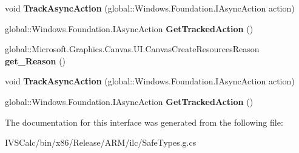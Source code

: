 \begin{DoxyCompactItemize}
\mbox{\label{interface_microsoft_1_1_graphics_1_1_canvas_1_1_u_i_1_1_i_canvas_create_resources_event_args_ae461ac51300d37bcfbf7dc9a26b1cd3c}} 
void {\bfseries Track\+Async\+Action} (global\+::\+Windows.\+Foundation.\+I\+Async\+Action action)
\item 
\mbox{\label{interface_microsoft_1_1_graphics_1_1_canvas_1_1_u_i_1_1_i_canvas_create_resources_event_args_ad6d26af5db5c9cd3edb2cd291ff5c79f}} 
global\+::\+Windows.\+Foundation.\+I\+Async\+Action {\bfseries Get\+Tracked\+Action} ()
\item 
\mbox{\label{interface_microsoft_1_1_graphics_1_1_canvas_1_1_u_i_1_1_i_canvas_create_resources_event_args_ab4823024154414a76a2513719de582fd}} 
global\+::\+Microsoft.\+Graphics.\+Canvas.\+U\+I.\+Canvas\+Create\+Resources\+Reason {\bfseries get\+\_\+\+Reason} ()
\item 
\mbox{\label{interface_microsoft_1_1_graphics_1_1_canvas_1_1_u_i_1_1_i_canvas_create_resources_event_args_ae461ac51300d37bcfbf7dc9a26b1cd3c}} 
void {\bfseries Track\+Async\+Action} (global\+::\+Windows.\+Foundation.\+I\+Async\+Action action)
\item 
\mbox{\label{interface_microsoft_1_1_graphics_1_1_canvas_1_1_u_i_1_1_i_canvas_create_resources_event_args_ad6d26af5db5c9cd3edb2cd291ff5c79f}} 
global\+::\+Windows.\+Foundation.\+I\+Async\+Action {\bfseries Get\+Tracked\+Action} ()
\end{DoxyCompactItemize}


The documentation for this interface was generated from the following file\+:\begin{DoxyCompactItemize}
\item 
I\+V\+S\+Calc/bin/x86/\+Release/\+A\+R\+M/ilc/Safe\+Types.\+g.\+cs\end{DoxyCompactItemize}
